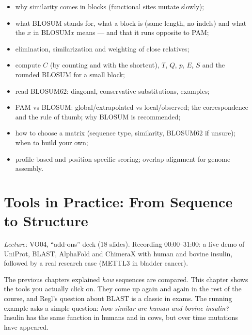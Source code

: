 \documentclass[11pt, oneside]{book}
\newcommand{\lectureref}[1]{%
  \par{\small\color{gray!70!black}\textit{Lecture:} #1}\par}
\begin{document}
\begin{itemize}
  \item why similarity comes in blocks (functional sites mutate slowly);
  \item what BLOSUM stands for, what a block is (same length, no indels) and
    what the $x$ in BLOSUM$x$ means --- and that it runs opposite to PAM;
  \item elimination, similarization and weighting of close relatives;
  \item compute $C$ (by counting and with the shortcut), $T$, $Q$, $p$, $E$,
    $S$ and the rounded BLOSUM for a small block;
  \item read BLOSUM62: diagonal, conservative substitutions, examples;
  \item PAM vs BLOSUM: global/extrapolated vs local/observed; the
    correspondence and the rule of thumb; why BLOSUM is recommended;
  \item how to choose a matrix (sequence type, similarity, BLOSUM62 if unsure);
    when to build your own;
  \item profile-based and position-specific scoring; overlap alignment for
    genome assembly.
\end{itemize}

\chapter{Tools in Practice: From Sequence to Structure}
\label{ch:tools}

\lectureref{VO04, ``add-ons'' deck (18 slides). Recording 00:00--31:00: a live
demo of UniProt, BLAST, AlphaFold and ChimeraX with human and bovine insulin,
followed by a real research case (METTL3 in bladder cancer).}

The previous chapters explained \emph{how} sequences are compared. This chapter
shows the tools you actually click on. They come up again and again in the rest
of the course, and Regl's question about BLAST is a classic in exams. The
running example asks a simple question: \emph{how similar are human and bovine
insulin?} Insulin has the same function in humans and in cows, but over time
mutations have appeared.
\end{document}

